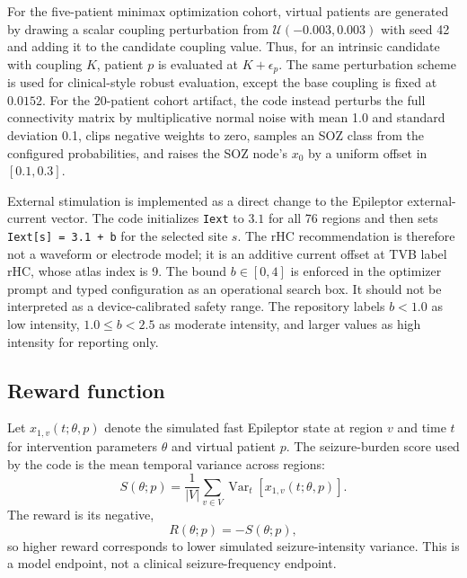 \documentclass{article}
\begin{document}
For the five-patient minimax optimization cohort, virtual patients are generated by drawing a scalar coupling perturbation from $\mathcal{U}(-0.003,0.003)$ with seed 42 and adding it to the candidate coupling value. Thus, for an intrinsic candidate with coupling $K$, patient $p$ is evaluated at $K+\epsilon_p$. The same perturbation scheme is used for clinical-style robust evaluation, except the base coupling is fixed at $0.0152$. For the 20-patient cohort artifact, the code instead perturbs the full connectivity matrix by multiplicative normal noise with mean 1.0 and standard deviation 0.1, clips negative weights to zero, samples an SOZ class from the configured probabilities, and raises the SOZ node's $x_0$ by a uniform offset in $[0.1,0.3]$.

External stimulation is implemented as a direct change to the Epileptor external-current vector. The code initializes \texttt{Iext} to $3.1$ for all 76 regions and then sets \texttt{Iext[s] = 3.1 + b} for the selected site $s$. The rHC recommendation is therefore not a waveform or electrode model; it is an additive current offset at TVB label rHC, whose atlas index is 9. The bound $b\in[0,4]$ is enforced in the optimizer prompt and typed configuration as an operational search box. It should not be interpreted as a device-calibrated safety range. The repository labels $b<1.0$ as low intensity, $1.0\leq b<2.5$ as moderate intensity, and larger values as high intensity for reporting only.

\subsection{Reward function}
Let $x_{1,v}(t;\theta,p)$ denote the simulated fast Epileptor state at region $v$ and time $t$ for intervention parameters $\theta$ and virtual patient $p$. The seizure-burden score used by the code is the mean temporal variance across regions:
\begin{equation}
  S(\theta;p)=\frac{1}{|V|}\sum_{v\in V}\operatorname{Var}_{t}\left[x_{1,v}(t;\theta,p)\right].
\end{equation}
The reward is its negative,
\begin{equation}
  R(\theta;p)=-S(\theta;p),
\end{equation}
so higher reward corresponds to lower simulated seizure-intensity variance. This is a model endpoint, not a clinical seizure-frequency endpoint.
\end{document}
